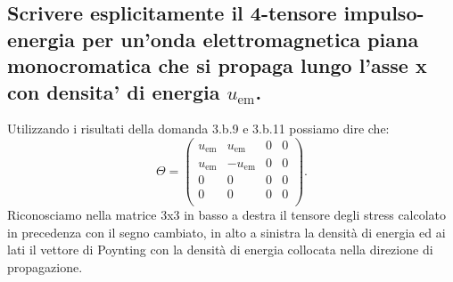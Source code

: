 \subsection[]{Scrivere esplicitamente il 4-tensore impulso-energia per un’onda elettromagnetica piana monocromatica che si propaga lungo l’asse x con densita’ di energia $u_{\text{em}}$.}
\label{sec:3.b.12}
Utilizzando i risultati della domanda 3.b.9 e 3.b.11 possiamo dire che:
\[
\Theta=
\left(
\begin{array}{cccc}
	u_{\text{em}} & u_{\text{em}}  & 0 & 0 \\   
	u_{\text{em}} & -u_{\text{em}} & 0 & 0 \\
	0 & 0 & 0 & 0 \\
	0 & 0 & 0 & 0 \\
\end{array}
\right)
.\] 
Riconosciamo nella matrice 3x3 in basso a destra il tensore degli stress calcolato in precedenza con il segno cambiato, in alto a sinistra la densità di energia ed ai lati il vettore di Poynting con la densità di energia collocata nella direzione di propagazione.

